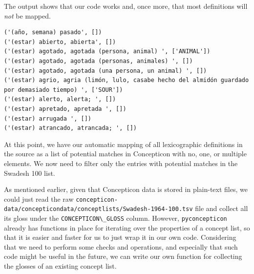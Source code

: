 \documentclass[
  a4paper,
  14pt,
  oneside,
  tablecaptionabove
]{scrbook}
\newcommand{\passthrough}[1]{#1}
\begin{document}
The output shows that our code works and, once more, that most
definitions will \emph{not} be mapped.

\begin{lstlisting}
('(año, semana) pasado', [])
('(estar) abierto, abierta', [])
('(estar) agotado, agotada (persona, animal) ', ['ANIMAL'])
('(estar) agotado, agotada (personas, animales) ', [])
('(estar) agotado, agotada (una persona, un animal) ', [])
('(estar) agrio, agria (limón, lulo, casabe hecho del almidón guardado por demasiado tiempo) ', ['SOUR'])
('(estar) alerto, alerta; ', [])
('(estar) apretado, apretada ', [])
('(estar) arrugada ', [])
('(estar) atrancado, atrancada; ', [])
\end{lstlisting}

At this point, we have our automatic mapping of all lexicographic
definitions in the source as a list of potential matches in Concepticon
with no, one, or multiple elements. We now need to filter only the
entries with potential matches in the Swadesh 100 list.

As mentioned earlier, given that Concepticon data is stored in
plain-text files, we could just read the raw
\passthrough{\lstinline!concepticon-data/concepticondata/conceptlists/Swadesh-1964-100.tsv!}
file and collect all its gloss under the
\passthrough{\lstinline!CONCEPTICON\_GLOSS!} column. However,
\passthrough{\lstinline!pyconcepticon!} already has functions in place
for iterating over the properties of a concept list, so that it is
easier and faster for us to just wrap it in our own code. Considering
that we need to perform some checks and operations, and especially that
such code might be useful in the future, we can write our own function
for collecting the glosses of an existing concept list.
\end{document}
